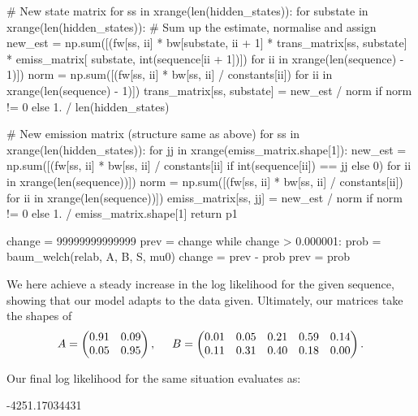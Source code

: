 \documentclass[10pt]{article}\usepackage[]{graphicx}\usepackage[]{color}
\theoremstyle{plain}
\begin{document}
\begin{Schunk}
\begin{Sinput}
    # New state matrix
    for ss in xrange(len(hidden_states)):
        for substate in xrange(len(hidden_states)):
            # Sum up the estimate, normalise and assign
            new_est = np.sum([(fw[ss, ii] * bw[substate, ii + 1] * trans_matrix[ss, substate] * emiss_matrix[
                substate, int(sequence[ii + 1])]) for ii in xrange(len(sequence) - 1)])
            norm = np.sum([(fw[ss, ii] * bw[ss, ii] / constants[ii]) for ii in xrange(len(sequence) - 1)])
            trans_matrix[ss, substate] = new_est / norm if norm != 0 else 1. / len(hidden_states)

    # New emission matrix (structure same as above)
    for ss in xrange(len(hidden_states)):
        for jj in xrange(emiss_matrix.shape[1]):
            new_est = np.sum([(fw[ss, ii] * bw[ss, ii] / constants[ii] if int(sequence[ii]) == jj else 0) for ii in
                              xrange(len(sequence))])
            norm = np.sum([(fw[ss, ii] * bw[ss, ii] / constants[ii]) for ii in xrange(len(sequence))])
            emiss_matrix[ss, jj] = new_est / norm if norm != 0 else 1. / emiss_matrix.shape[1]
    return p1

change = 99999999999999
prev   = change
while change > 0.000001:
    prob = baum_welch(relab, A, B, S, mu0)
    change = prev - prob
    prev = prob
\end{Sinput}
\end{Schunk}
We here achieve a steady increase in the log likelihood for the given sequence, showing that our model adapts to the data given. Ultimately, our matrices take the shapes of 
\[
A =
\begin{pmatrix}
  0.91 & 0.09 \\ 0.05 & 0.95
\end{pmatrix},\hspace{.5cm} 
B =
\begin{pmatrix}
  0.01 & 0.05 & 0.21 & 0.59 & 0.14 \\ 0.11 & 0.31 & 0.40 & 0.18 & 0.00
\end{pmatrix}.
\]

Our final log likelihood for the same situation evaluates as:
\begin{Schunk}
\begin{Soutput}
-4251.17034431
\end{Soutput}
\end{Schunk}
\end{document}
